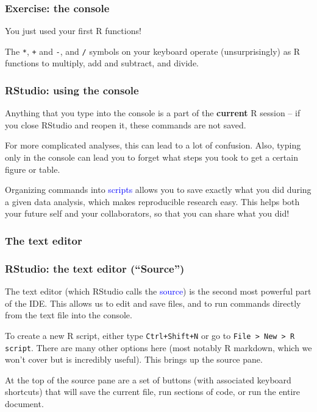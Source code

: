 \documentclass[11pt,dvipsnames]{beamer}
\newcommand{\myframe}[1]{\begin{frame} \frametitle{#1}}
\begin{document}
\begin{frame}
\frametitle{Exercise: the console}
You just used your first R functions! 

The \texttt{*}, \texttt{+} and \texttt{-}, and \texttt{/} symbols on your keyboard operate (unsurprisingly) as R functions to multiply, add and subtract, and divide.
\end{frame}

\begin{frame}
\frametitle{RStudio: using the console}
Anything that you type into the console is a part of the \textbf{current} R session -- if you close RStudio and reopen it, these commands are not saved.

For more complicated analyses, this can lead to a lot of confusion. Also, typing only in the console can lead you to forget what steps you took to get a certain figure or table.

Organizing commands into \textcolor{blue}{scripts} allows you to save exactly what you did during a given data analysis, which makes reproducible research easy. This helps both your future self and your collaborators, so that you can share what you did!
\end{frame}

\subsubsection{The text editor}
\myframe{RStudio: the text editor (``Source'')}
The text editor (which RStudio calls the \textcolor{blue}{source}) is the second most powerful part of the IDE. This allows us to edit and save files, and to run commands directly from the text file into the console.

To create a new R script, either type \texttt{Ctrl+Shift+N} or go to \texttt{File > New > R script}. There are many other options here (most notably R markdown, which we won't cover but is incredibly useful). This brings up the source pane.

At the top of the source pane are a set of buttons (with associated keyboard shortcuts) that will save the current file, run sections of code, or run the entire document. 
\end{frame}
\end{document}
